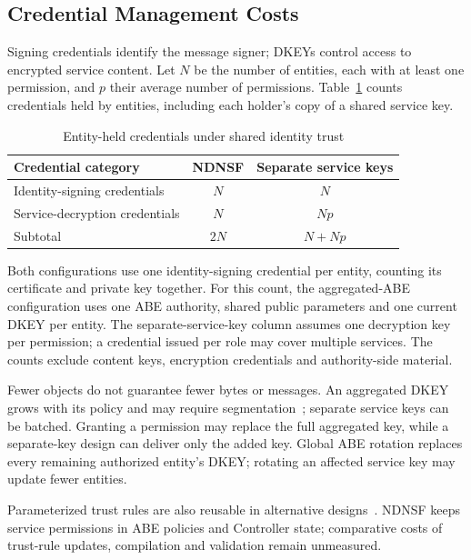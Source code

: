 \subsection{Credential Management Costs}
\label{sec:credential-cost}
\label{sec:measured-permission-cost}

Signing credentials identify the message signer; DKEYs control access to encrypted service content. Let $N$ be the number of entities, each with at least one permission, and $p$ their average number of permissions. Table~\ref{tab:credential-counts} counts credentials held by entities, including each holder's copy of a shared service key.

\begin{table}[t]
\centering
\caption{Entity-held credentials under shared identity trust}
\label{tab:credential-counts}
\small
\begin{tabularx}{\columnwidth}{@{}Xcc@{}}
\toprule
Credential category & NDNSF & Separate service keys \\
\midrule
Identity-signing credentials & $N$ & $N$ \\
Service-decryption credentials & $N$ & $Np$ \\
Subtotal & $2N$ & $N+Np$ \\
\bottomrule
\end{tabularx}
\end{table}

Both configurations use one identity-signing credential per entity, counting its certificate and private key together. For this count, the aggregated-ABE configuration uses one ABE authority, shared public parameters and one current DKEY per entity. The separate-service-key column assumes one decryption key per permission; a credential issued per role may cover multiple services. The counts exclude content keys, encryption credentials and authority-side material.

Fewer objects do not guarantee fewer bytes or messages. An aggregated DKEY grows with its policy and may require segmentation~\cite{dulal2023nac-abe}; separate service keys can be batched. Granting a permission may replace the full aggregated key, while a separate-key design can deliver only the added key. Global ABE rotation replaces every remaining authorized entity's DKEY; rotating an affected service key may update fewer entities.

Parameterized trust rules are also reusable in alternative designs~\cite{nichols2019dnmp,yu2015trust}. NDNSF keeps service permissions in ABE policies and Controller state; comparative costs of trust-rule updates, compilation and validation remain unmeasured.
